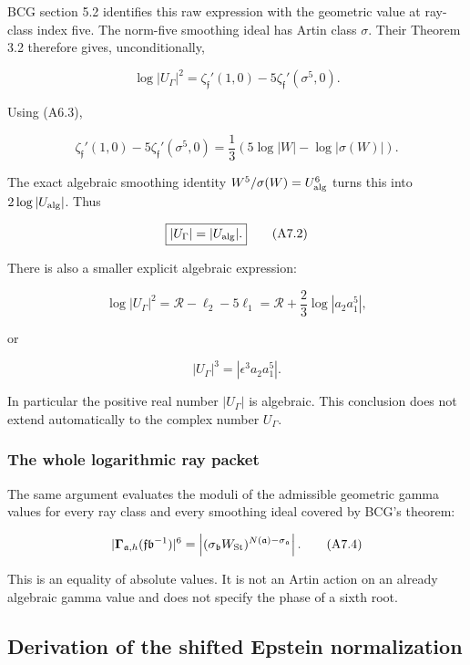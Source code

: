 BCG section 5.2 identifies this raw expression with the geometric value
at ray-class index five. The norm-five smoothing ideal has Artin class
\(\sigma\). Their Theorem 3.2 therefore gives, unconditionally,

\[
\log|U_\Gamma|^2
=\zeta_{\mathfrak f}'(1,0)-5\zeta_{\mathfrak f}'(\sigma^5,0). \tag{A7.1}
\]

Using (A6.3),

\[
\zeta_{\mathfrak f}'(1,0)-5\zeta_{\mathfrak f}'(\sigma^5,0)
=\frac13\left(5\log|W|-\log|\sigma(W)|\right).
\]

The exact algebraic smoothing identity \(W^5/\sigma(W)=U_{\rm alg}^6\)
turns this into \(2\log|U_{\rm alg}|\). Thus

\[
\boxed{|U_\Gamma|=|U_{\rm alg}|.} \tag{A7.2}
\]

There is also a smaller explicit algebraic expression:

\[
\log|U_\Gamma|^2
=\mathcal R-\ell_2-5\ell_1
=\mathcal R+\frac23\log|a_2a_1^5|,
\]

or

\[
\boxed{|U_\Gamma|^3=|\epsilon^3a_2a_1^5|.} \tag{A7.3}
\]

In particular the positive real number \(|U_\Gamma|\) is algebraic. This
conclusion does not extend automatically to the complex number
\(U_\Gamma\).

\hypertarget{A-the-whole-logarithmic-ray-packet}{%
\subsubsection{The whole logarithmic ray
packet}\label{A-the-whole-logarithmic-ray-packet}}

The same argument evaluates the moduli of the admissible geometric gamma
values for every ray class and every smoothing ideal covered by BCG's
theorem:

\[
|\mathbf\Gamma_{\mathfrak a,h}(\mathfrak f\mathfrak b^{-1})|^6
=\left|(\sigma_{\mathfrak b}W_{\rm St})^{N(\mathfrak a)-\sigma_{\mathfrak a}}\right|.
\tag{A7.4}
\]

This is an equality of absolute values. It is not an Artin action on an
already algebraic gamma value and does not specify the phase of a sixth
root.

\hypertarget{A-derivation-of-the-shifted-epstein-normalization}{%
\subsection{Derivation of the shifted Epstein
normalization}\label{A-derivation-of-the-shifted-epstein-normalization}}

